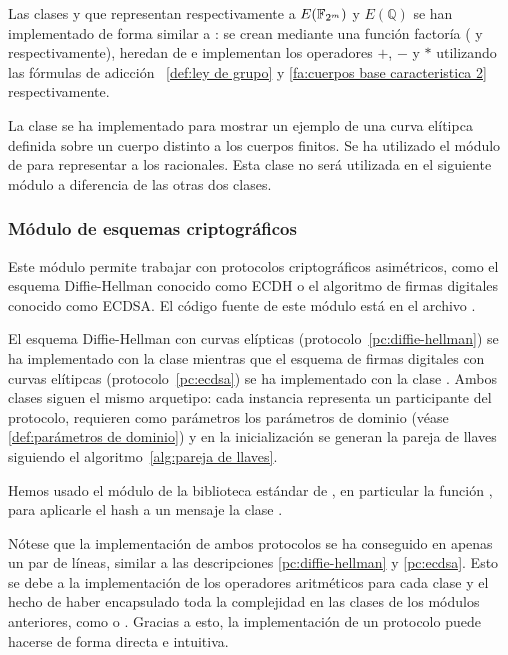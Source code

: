 Las clases  y  que representan respectivamente a $E(\mathbb{F}_{2^m})$ y $E(\mathbb{Q})$ se han implementado de forma similar a : se crean mediante una función factoría ( y  respectivamente), heredan de  e implementan los operadores $+$, $-$ y $*$ utilizando las fórmulas de adicción ~\ref{def:ley de grupo} y \ref{fa:cuerpos base caracteristica 2} respectivamente.

La clase  se ha implementado para mostrar un ejemplo de una curva elítipca definida sobre un cuerpo distinto a los cuerpos finitos. Se ha utilizado el módulo  de  para representar a los racionales. Esta clase no será utilizada en el siguiente módulo a diferencia de las otras dos clases.

\subsubsection{Módulo de esquemas criptográficos}
\label{subs:Módulo de esquemas criptográficos}

Este módulo permite trabajar con protocolos criptográficos asimétricos,
como el esquema Diffie-Hellman conocido como ECDH o el algoritmo
de firmas digitales conocido como ECDSA. El código fuente de este módulo está en el archivo .

El esquema Diffie-Hellman con curvas elípticas (protocolo~\ref{pc:diffie-hellman}) se ha implementado con la clase  mientras que el esquema de firmas digitales con curvas elítipcas (protocolo~\ref{pc:ecdsa}) se ha implementado con la clase . Ambos clases siguen el mismo arquetipo: cada instancia representa un participante del protocolo, requieren como parámetros los parámetros de dominio (véase \ref{def:parámetros de dominio}) y en la inicialización se generan la pareja de llaves siguiendo el algoritmo~\ref{alg:pareja de llaves}.

Hemos usado el módulo  de la biblioteca estándar de , en particular la función , para aplicarle el hash a un mensaje la clase .

Nótese que la implementación de ambos protocolos se ha conseguido en apenas un par de líneas, similar a las descripciones \ref{pc:diffie-hellman} y \ref{pc:ecdsa}. Esto se debe a la implementación de los operadores aritméticos para cada clase y el hecho de haber encapsulado toda la complejidad en las clases de los módulos anteriores, como  o . Gracias a esto, la implementación de un protocolo puede hacerse de forma directa e intuitiva.

